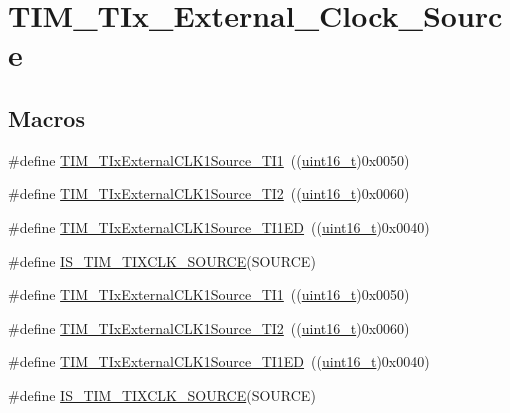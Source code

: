 \hypertarget{group___t_i_m___t_ix___external___clock___source}{}\section{T\+I\+M\+\_\+\+T\+Ix\+\_\+\+External\+\_\+\+Clock\+\_\+\+Source}
\label{group___t_i_m___t_ix___external___clock___source}
\subsection*{Macros}
\begin{DoxyCompactItemize}
\item 
\#define \hyperlink{group___t_i_m___t_ix___external___clock___source_ga237daecde6e1f75509acc80a9ccce820}{T\+I\+M\+\_\+\+T\+Ix\+External\+C\+L\+K1\+Source\+\_\+\+T\+I1}~((\hyperlink{_p_e___types_8h_a1f1825b69244eb3ad2c7165ddc99c956}{uint16\+\_\+t})0x0050)
\item 
\#define \hyperlink{group___t_i_m___t_ix___external___clock___source_gafa3c6345a7e1c3668b2e7e4d61a79491}{T\+I\+M\+\_\+\+T\+Ix\+External\+C\+L\+K1\+Source\+\_\+\+T\+I2}~((\hyperlink{_p_e___types_8h_a1f1825b69244eb3ad2c7165ddc99c956}{uint16\+\_\+t})0x0060)
\item 
\#define \hyperlink{group___t_i_m___t_ix___external___clock___source_gaa1a749bc38d434902b69a45d50ee0889}{T\+I\+M\+\_\+\+T\+Ix\+External\+C\+L\+K1\+Source\+\_\+\+T\+I1\+ED}~((\hyperlink{_p_e___types_8h_a1f1825b69244eb3ad2c7165ddc99c956}{uint16\+\_\+t})0x0040)
\item 
\#define \hyperlink{group___t_i_m___t_ix___external___clock___source_gabfa9cd6cf6e9df4bff8d6cdf16c6b374}{I\+S\+\_\+\+T\+I\+M\+\_\+\+T\+I\+X\+C\+L\+K\+\_\+\+S\+O\+U\+R\+CE}(S\+O\+U\+R\+CE)
\item 
\#define \hyperlink{group___t_i_m___t_ix___external___clock___source_ga237daecde6e1f75509acc80a9ccce820}{T\+I\+M\+\_\+\+T\+Ix\+External\+C\+L\+K1\+Source\+\_\+\+T\+I1}~((\hyperlink{_p_e___types_8h_a1f1825b69244eb3ad2c7165ddc99c956}{uint16\+\_\+t})0x0050)
\item 
\#define \hyperlink{group___t_i_m___t_ix___external___clock___source_gafa3c6345a7e1c3668b2e7e4d61a79491}{T\+I\+M\+\_\+\+T\+Ix\+External\+C\+L\+K1\+Source\+\_\+\+T\+I2}~((\hyperlink{_p_e___types_8h_a1f1825b69244eb3ad2c7165ddc99c956}{uint16\+\_\+t})0x0060)
\item 
\#define \hyperlink{group___t_i_m___t_ix___external___clock___source_gaa1a749bc38d434902b69a45d50ee0889}{T\+I\+M\+\_\+\+T\+Ix\+External\+C\+L\+K1\+Source\+\_\+\+T\+I1\+ED}~((\hyperlink{_p_e___types_8h_a1f1825b69244eb3ad2c7165ddc99c956}{uint16\+\_\+t})0x0040)
\item 
\#define \hyperlink{group___t_i_m___t_ix___external___clock___source_gabfa9cd6cf6e9df4bff8d6cdf16c6b374}{I\+S\+\_\+\+T\+I\+M\+\_\+\+T\+I\+X\+C\+L\+K\+\_\+\+S\+O\+U\+R\+CE}(S\+O\+U\+R\+CE)
\end{DoxyCompactItemize}


